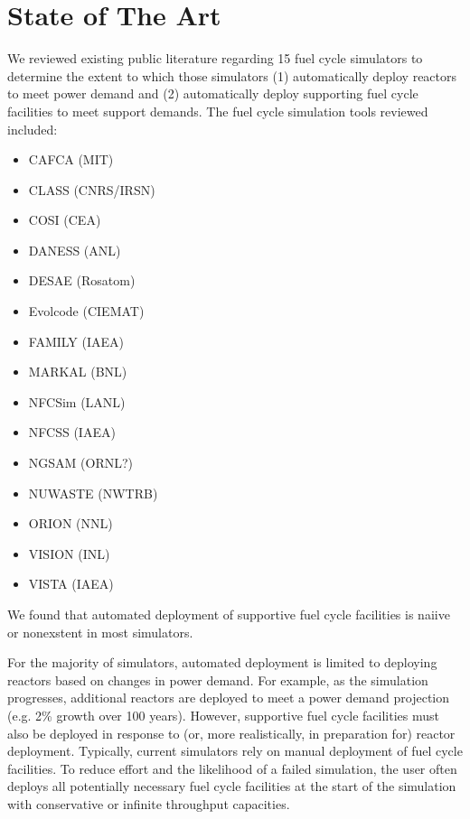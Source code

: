 \section{State of The Art}

We reviewed existing public literature regarding 15 fuel cycle simulators to 
determine the extent to which those simulators (1) automatically deploy reactors to 
meet power demand and (2) automatically deploy supporting fuel cycle facilities 
to meet support demands. The fuel cycle simulation tools reviewed included:
\begin{itemize}
        \item CAFCA (MIT) \cite{cafca}
        \item CLASS (CNRS/IRSN) \cite{class}
        \item COSI (CEA) \cite{cosi}
        \item DANESS (ANL) \cite{daness}
        \item DESAE (Rosatom) \cite{desae}
        \item Evolcode (CIEMAT) \cite{evolcode}
        \item FAMILY (IAEA) \cite{family}
        \item MARKAL (BNL) \cite{markal}
        \item NFCSim (LANL) \cite{nfcsim}
        \item NFCSS (IAEA) \cite{nfcss}
        \item NGSAM (ORNL?) \cite{ngsam}
        \item NUWASTE (NWTRB) \cite{nuwaste}
        \item ORION (NNL) \cite{orion}
        \item VISION (INL) \cite{vision}
        \item VISTA (IAEA) \cite{vista}
\end{itemize}

We found that automated deployment of supportive fuel cycle facilities is naiive or 
nonexstent in most simulators. 

For the majority of simulators, automated deployment is limited to deploying 
reactors based on changes in power demand. 
For example, as the simulation 
progresses, additional reactors are deployed to meet a power demand projection 
(e.g. 2\% growth over 100 years). 
However, supportive fuel cycle facilities must also be deployed in response to 
(or, more realistically, in preparation for) reactor deployment.  
Typically, current simulators rely on manual deployment of fuel cycle 
facilities. To reduce effort and the likelihood of a failed simulation, the 
user often deploys all potentially necessary fuel cycle facilities at the start 
of the simulation with conservative or infinite throughput capacities. 

